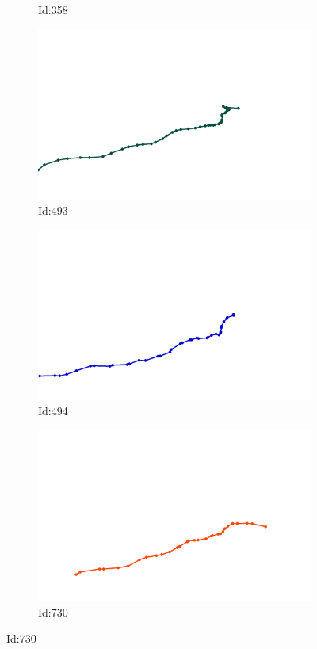 \documentclass[12pt,twoside]{report}
\begin{document}
\begin{figure}
\begin{subfigure}[b]{0.20\textwidth}
\caption{Id:358}
\end{subfigure}
\begin{subfigure}[b]{0.20\textwidth}
\centering
\includegraphics[width=\textwidth]{../../trajectories/493.png}
\caption{Id:493}
\end{subfigure}
\begin{subfigure}[b]{0.20\textwidth}
\centering
\includegraphics[width=\textwidth]{../../trajectories/494.png}
\caption{Id:494}
\end{subfigure}
\begin{subfigure}[b]{0.20\textwidth}
\centering
\includegraphics[width=\textwidth]{../../trajectories/730.png}
\caption{Id:730}
\end{subfigure}
\end{figure}
\end{document}
